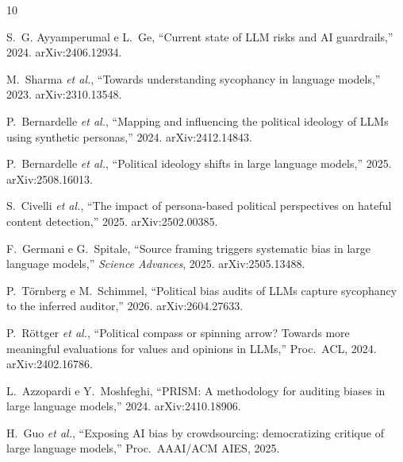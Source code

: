 \documentclass[conference]{IEEEtran}
\begin{document}
\begin{thebibliography}{10}
\footnotesize

S.~G. Ayyamperumal e L.~Ge, ``Current state of LLM risks and AI guardrails,''
2024. arXiv:2406.12934.

M.~Sharma \textit{et al.}, ``Towards understanding sycophancy in language
models,'' 2023. arXiv:2310.13548.

P.~Bernardelle \textit{et al.}, ``Mapping and influencing the political ideology
of LLMs using synthetic personas,'' 2024. arXiv:2412.14843.

P.~Bernardelle \textit{et al.}, ``Political ideology shifts in large language
models,'' 2025. arXiv:2508.16013.

S.~Civelli \textit{et al.}, ``The impact of persona-based political perspectives
on hateful content detection,'' 2025. arXiv:2502.00385.

F.~Germani e G.~Spitale, ``Source framing triggers systematic bias in large
language models,'' \textit{Science Advances}, 2025. arXiv:2505.13488.

P.~Törnberg e M.~Schimmel, ``Political bias audits of LLMs capture sycophancy to
the inferred auditor,'' 2026. arXiv:2604.27633.

P.~Röttger \textit{et al.}, ``Political compass or spinning arrow? Towards more
meaningful evaluations for values and opinions in LLMs,'' Proc.\ ACL, 2024.
arXiv:2402.16786.

L.~Azzopardi e Y.~Moshfeghi, ``PRISM: A methodology for auditing biases in large
language models,'' 2024. arXiv:2410.18906.

H.~Guo \textit{et al.}, ``Exposing AI bias by crowdsourcing: democratizing
critique of large language models,'' Proc.\ AAAI/ACM AIES, 2025.

\end{thebibliography}
\end{document}

